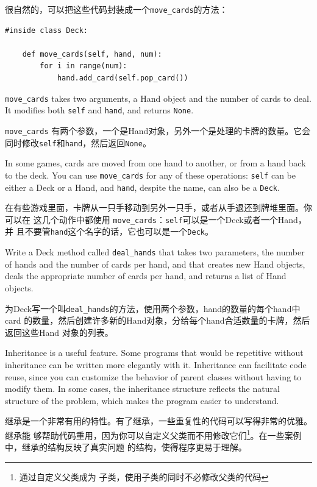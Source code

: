 \documentclass[10pt]{book}
\begin{document}
\begin{CJK}{UTF8}{gbsn}
很自然的，可以把这些代码封装成一个\verb"move_cards"的方法：

\begin{verbatim}
#inside class Deck:

    def move_cards(self, hand, num):
        for i in range(num):
            hand.add_card(self.pop_card())
\end{verbatim}
%
\verb"move_cards" takes two arguments, a Hand object and the number of
cards to deal.  It modifies both {\tt self} and {\tt hand}, and
returns {\tt None}.

\verb"move_cards" 有两个参数，一个是Hand对象，另外一个是处理的卡牌的数量。它会
同时修改{\tt self}和{\tt hand}，然后返回{\tt None}。

In some games, cards are moved from one hand to another,
or from a hand back to the deck.  You can use \verb"move_cards"
for any of these operations: {\tt self} can be either a Deck
or a Hand, and {\tt hand}, despite the name, can also be a {\tt Deck}.

在有些游戏里面，卡牌从一只手移动到另外一只手，或者从手退还到牌堆里面。你可以在
这几个动作中都使用 \verb"move_cards"：{\tt self}可以是一个Deck或者一个Hand，并
且不要管{\tt hand}这个名字的话，它也可以是一个{\tt Deck}。

\begin{exercise}

Write a Deck method called \verb"deal_hands" that takes two
parameters, the number of hands and the number of cards per
hand, and that creates new Hand objects, deals the appropriate
number of cards per hand, and returns a list of Hand objects.

为Deck写一个叫\verb"deal_hands"的方法，使用两个参数，hand的数量的每个hand中card
的数量，然后创建许多新的Hand对象，分给每个hand合适数量的卡牌，然后返回这些Hand
对象的列表。

\end{exercise}

Inheritance is a useful feature.  Some programs that would be
repetitive without inheritance can be written more elegantly
with it.  Inheritance can facilitate code reuse, since you can
customize the behavior of parent classes without having to modify
them.  In some cases, the inheritance structure reflects the natural
structure of the problem, which makes the program easier to
understand.

继承是一个非常有用的特性。有了继承，一些重复性的代码可以写得非常的优雅。继承能
够帮助代码重用，因为你可以自定义父类而不用修改它们\footnote{通过自定义父类成为
子类，使用子类的同时不必修改父类的代码}。在一些案例中，继承的结构反映了真实问题
的结构，使得程序更易于理解。


\end{CJK}
\end{document}
